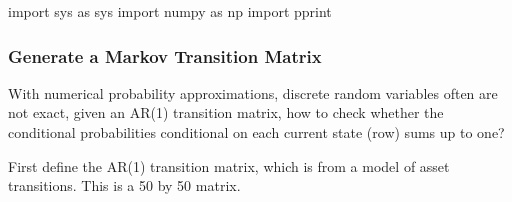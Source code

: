 \documentclass[
]{book}
\newenvironment{Shaded}{\begin{snugshade}}{\end{snugshade}}
\newcommand{\ImportTok}[1]{#1}
\newcommand{\NormalTok}[1]{#1}
\begin{document}
\begin{Shaded}
\begin{Highlighting}[]
\ImportTok{import}\NormalTok{ sys }\ImportTok{as}\NormalTok{ sys}
\ImportTok{import}\NormalTok{ numpy }\ImportTok{as}\NormalTok{ np}
\ImportTok{import}\NormalTok{ pprint}
\end{Highlighting}
\end{Shaded}

\hypertarget{generate-a-markov-transition-matrix}{%
\subsubsection{Generate a Markov Transition Matrix}\label{generate-a-markov-transition-matrix}}

With numerical probability approximations, discrete random variables often are not exact, given an AR(1) transition matrix, how to check whether the conditional probabilities conditional on each current state (row) sums up to one?

First define the AR(1) transition matrix, which is from a model of asset transitions. This is a 50 by 50 matrix.
\end{document}
